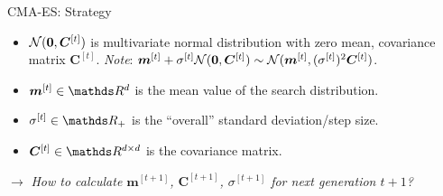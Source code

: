 \documentclass[11pt,compress,t,notes=noshow, xcolor=table]{beamer}
\begin{document}
\begin{vbframe}{CMA-ES: Strategy}
\begin{itemize}
\item $\mathcal{N}(\bm{0}, \bm{C}^{[t]})$ is multivariate normal distribution with zero mean, covariance matrix $\bm{C}^{[t]}$. \textit{Note}: $\bm{m}^{[t]} + \sigma^{[t]} \mathcal{N}(\bm{0}, \bm{C}^{[t]}) \sim \mathcal{N}(\bm{m}^{[t]}, (\sigma^{[t]})^2 \bm{C}^{[t]})$.
\item $\bm{m}^{[t]} \in \R^d$ is the mean value of the search distribution.
\item $\sigma^{[t]} \in \R_{+}$ is the \enquote{overall} standard deviation/step size.
\item $\bm{C}^{[t]} \in \R^{d \times d}$ is the covariance matrix.
\end{itemize}

$\rightarrow$ \textit{How to calculate $\bm{m}^{[t+1]}$, $\bm{C}^{[t+1]}$, $\sigma^{[t+1]}$ for next generation $t+1$?}
\end{vbframe}






\end{document}
